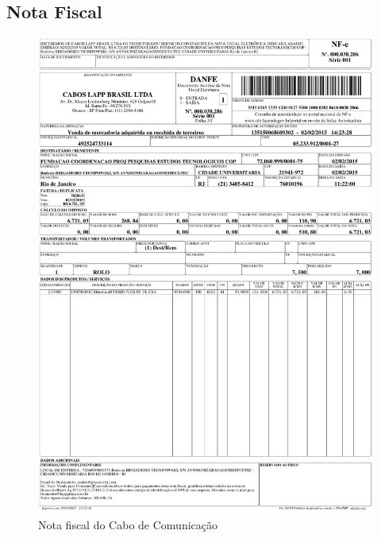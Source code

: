 \subsection{Nota Fiscal}
\begin{figure}[H]
 \centering
 \includegraphics[width=0.9\columnwidth]{CaboComm/nota.pdf}
 \caption{Nota fiscal do Cabo de Comunicação}
 \end{figure}